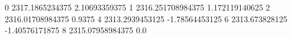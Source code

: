0 2317.1865234375 2.10693359375
1 2316.251708984375 1.172119140625
2 2316.01708984375 0.9375
4 2313.2939453125 -1.78564453125
6 2313.673828125 -1.40576171875
8 2315.07958984375 0.0
